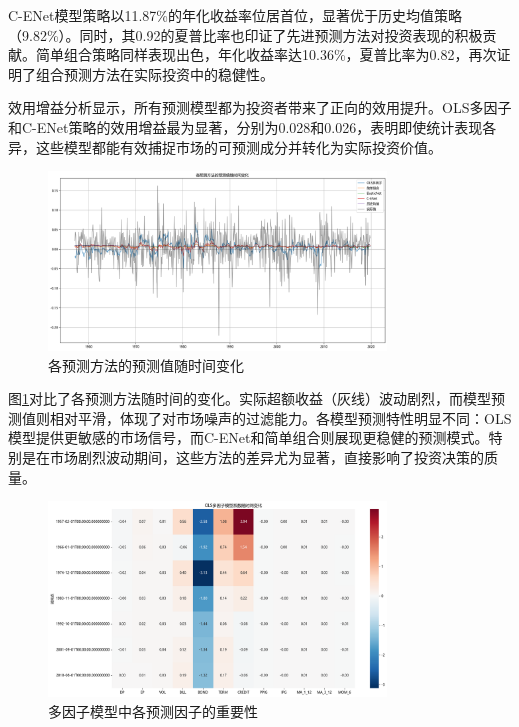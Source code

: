 \documentclass[12pt, a4paper]{article}
\begin{document}
C-ENet模型策略以11.87\%的年化收益率位居首位，显著优于历史均值策略（9.82\%）。同时，其0.92的夏普比率也印证了先进预测方法对投资表现的积极贡献。简单组合策略同样表现出色，年化收益率达10.36\%，夏普比率为0.82，再次证明了组合预测方法在实际投资中的稳健性。

效用增益分析显示，所有预测模型都为投资者带来了正向的效用提升。OLS多因子和C-ENet策略的效用增益最为显著，分别为0.028和0.026，表明即使统计表现各异，这些模型都能有效捕捉市场的可预测成分并转化为实际投资价值。

\begin{figure}[htbp]
\centering
\includegraphics[width=0.8\textwidth]{./img/各预测方法的预测值随时间变化.png}
\caption{各预测方法的预测值随时间变化}
\label{fig:prediction_timeseries}
\end{figure}

图\ref{fig:prediction_timeseries}对比了各预测方法随时间的变化。实际超额收益（灰线）波动剧烈，而模型预测值则相对平滑，体现了对市场噪声的过滤能力。各模型预测特性明显不同：OLS模型提供更敏感的市场信号，而C-ENet和简单组合则展现更稳健的预测模式。特别是在市场剧烈波动期间，这些方法的差异尤为显著，直接影响了投资决策的质量。

\begin{figure}[htbp]
\centering
\includegraphics[width=0.8\textwidth]{./img/OLS多因子模型系数热图.png}
\caption{多因子模型中各预测因子的重要性}
\label{fig:factor_importance}
\end{figure}
\end{document}
